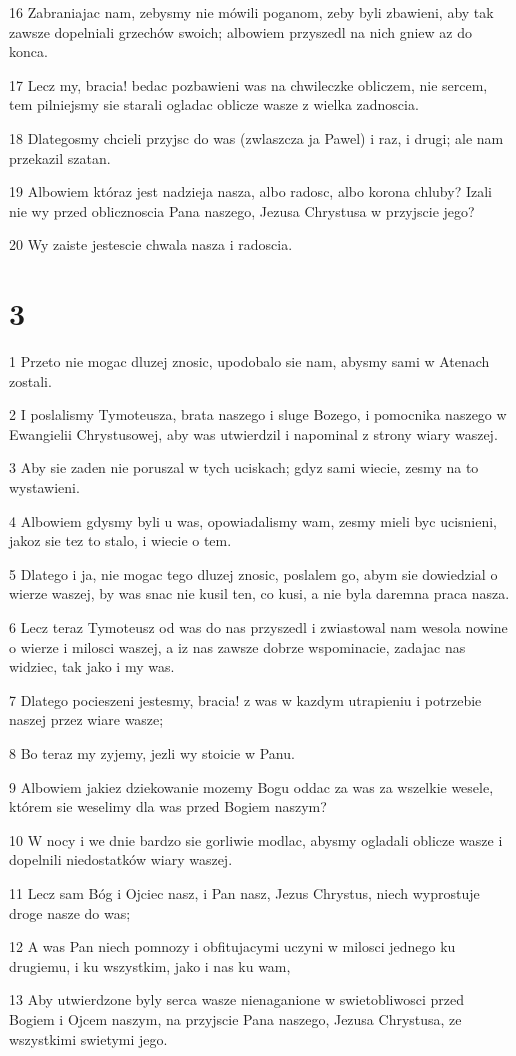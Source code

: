 \par 16 Zabraniajac nam, zebysmy nie mówili poganom, zeby byli zbawieni, aby tak zawsze dopelniali grzechów swoich; albowiem przyszedl na nich gniew az do konca.
\par 17 Lecz my, bracia! bedac pozbawieni was na chwileczke obliczem, nie sercem, tem pilniejsmy sie starali ogladac oblicze wasze z wielka zadnoscia.
\par 18 Dlategosmy chcieli przyjsc do was (zwlaszcza ja Pawel) i raz, i drugi; ale nam przekazil szatan.
\par 19 Albowiem któraz jest nadzieja nasza, albo radosc, albo korona chluby? Izali nie wy przed oblicznoscia Pana naszego, Jezusa Chrystusa w przyjscie jego?
\par 20 Wy zaiste jestescie chwala nasza i radoscia.

\chapter{3}

\par 1 Przeto nie mogac dluzej znosic, upodobalo sie nam, abysmy sami w Atenach zostali.
\par 2 I poslalismy Tymoteusza, brata naszego i sluge Bozego, i pomocnika naszego w Ewangielii Chrystusowej, aby was utwierdzil i napominal z strony wiary waszej.
\par 3 Aby sie zaden nie poruszal w tych uciskach; gdyz sami wiecie, zesmy na to wystawieni.
\par 4 Albowiem gdysmy byli u was, opowiadalismy wam, zesmy mieli byc ucisnieni, jakoz sie tez to stalo, i wiecie o tem.
\par 5 Dlatego i ja, nie mogac tego dluzej znosic, poslalem go, abym sie dowiedzial o wierze waszej, by was snac nie kusil ten, co kusi, a nie byla daremna praca nasza.
\par 6 Lecz teraz Tymoteusz od was do nas przyszedl i zwiastowal nam wesola nowine o wierze i milosci waszej, a iz nas zawsze dobrze wspominacie, zadajac nas widziec, tak jako i my was.
\par 7 Dlatego pocieszeni jestesmy, bracia! z was w kazdym utrapieniu i potrzebie naszej przez wiare wasze;
\par 8 Bo teraz my zyjemy, jezli wy stoicie w Panu.
\par 9 Albowiem jakiez dziekowanie mozemy Bogu oddac za was za wszelkie wesele, którem sie weselimy dla was przed Bogiem naszym?
\par 10 W nocy i we dnie bardzo sie gorliwie modlac, abysmy ogladali oblicze wasze i dopelnili niedostatków wiary waszej.
\par 11 Lecz sam Bóg i Ojciec nasz, i Pan nasz, Jezus Chrystus, niech wyprostuje droge nasze do was;
\par 12 A was Pan niech pomnozy i obfitujacymi uczyni w milosci jednego ku drugiemu, i ku wszystkim, jako i nas ku wam,
\par 13 Aby utwierdzone byly serca wasze nienaganione w swietobliwosci przed Bogiem i Ojcem naszym, na przyjscie Pana naszego, Jezusa Chrystusa, ze wszystkimi swietymi jego.

